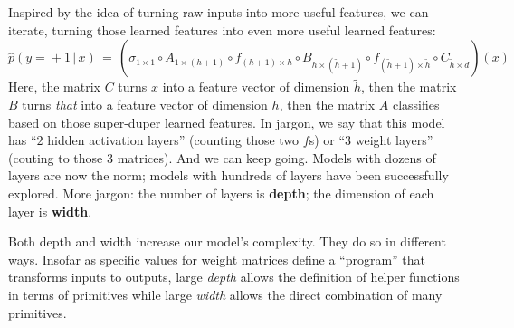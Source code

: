 %
  Inspired by the idea of turning raw inputs into more useful features, we
  can iterate, turning those learned features into even more useful learned features:
$$
  \hat p(y\!=\!+1\,|\,x) \,=\,
  (\sigma_{1\times 1} \circ
  A_{1\times (h+1)} \circ
  f_{(h+1)\times h} \circ
  B_{h\times (\tilde h+1)} \circ
  f_{(\tilde h+1)\times \tilde h} \circ
  C_{\tilde h\times d})(x)
$$
  Here, the matrix $C$ turns $x$ into a feature vector of dimension $\tilde h$,
  then the matrix $B$ turns \emph{that} into a feature vector of dimension $h$,
  then the matrix $A$ classifies based on those super-duper learned features.
  In jargon, we say that this model has ``$2$ hidden activation layers''
  (counting those two $f$s) or ``$3$ weight layers'' (couting to those $3$
  matrices).  And we can keep going.  Models with dozens of layers are now the
  norm; models with hundreds of layers have been successfully explored.  More
  jargon: the number of layers is \textbf{depth}; the dimension of each layer
  is \textbf{width}.

  Both depth and width increase our model's complexity.  They do so in
  different ways.  Insofar as specific values for weight matrices define a
  ``program'' that transforms inputs to outputs, large \emph{depth} allows the
  definition of helper functions in terms of primitives while large
  \emph{width} allows the direct combination of many primitives.

